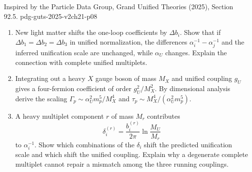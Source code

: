 \begin{enumerate}
  {Inspired by the Particle Data Group, Grand Unified Theories (2025),
  Section 92.5.}
  {pdg-guts-2025-v2ch21-p08}
  \begin{enumerate}
    \item[(a)]
    New light matter shifts the one-loop coefficients by
    \(\Delta b_i\).  Show that if
    \(\Delta b_1=\Delta b_2=\Delta b_3\) in unified normalization, the
    differences \(\alpha_i^{-1}-\alpha_j^{-1}\) and the inferred
    unification scale are unchanged, while \(\alpha_U\) changes.  Explain
    the connection with complete unified multiplets.
    \item[(b)]
    Integrating out a heavy \(X\) gauge boson of mass \(M_X\) and unified
    coupling \(g_U\) gives a four-fermion coefficient of order
    \(g_U^2/M_X^2\).  By dimensional analysis derive the scaling
    \(\Gamma_p\sim\alpha_U^2m_p^5/M_X^4\) and
    \(\tau_p\sim M_X^4/(\alpha_U^2m_p^5)\).
    \item[(c)]
    A heavy multiplet component \(r\) of mass \(M_r\) contributes
    \[
      \delta_i^{(r)}
        =\frac{b_i^{(r)}}{2\pi}\ln\frac{M_U}{M_r}
    \]
    to \(\alpha_i^{-1}\).  Show which combinations of the
    \(\delta_i\) shift the predicted unification scale and which shift the
    unified coupling.  Explain why a degenerate complete multiplet cannot
    repair a mismatch among the three running couplings.
  \end{enumerate}


\end{enumerate}
